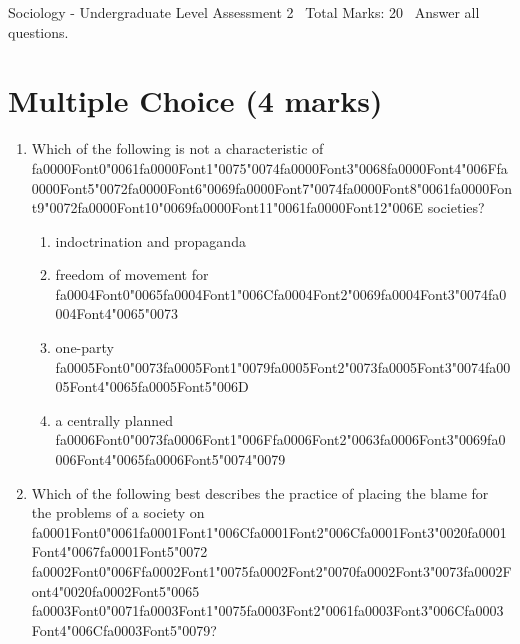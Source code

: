 \documentclass[12pt]{article}
\begin{document}
\begin{center}
Sociology - Undergraduate Level Assessment 2 \
Total Marks: 20 \
Answer all questions.
\end{center}

\section*{Multiple Choice (4 marks)}
\begin{enumerate}[label=\arabic*.]
\item Which of the following is not a characteristic of {\csname fa0000Font0\endcsname\char"0061}{\csname fa0000Font1\endcsname\char"0075}{\char"0074}{\csname fa0000Font3\endcsname\char"0068}{\csname fa0000Font4\endcsname\char"006F}{\csname fa0000Font5\endcsname\char"0072}{\csname fa0000Font6\endcsname\char"0069}{\csname fa0000Font7\endcsname\char"0074}{\csname fa0000Font8\endcsname\char"0061}{\csname fa0000Font9\endcsname\char"0072}{\csname fa0000Font10\endcsname\char"0069}{\csname fa0000Font11\endcsname\char"0061}{\csname fa0000Font12\endcsname\char"006E} societies?
\begin{enumerate}[label=(\alph*)]
    \item indoctrination and propaganda
    \item freedom of movement for {\csname fa0004Font0\endcsname\char"0065}{\csname fa0004Font1\endcsname\char"006C}{\csname fa0004Font2\endcsname\char"0069}{\csname fa0004Font3\endcsname\char"0074}{\csname fa0004Font4\endcsname\char"0065}{\char"0073}
    \item one-party {\csname fa0005Font0\endcsname\char"0073}{\csname fa0005Font1\endcsname\char"0079}{\csname fa0005Font2\endcsname\char"0073}{\csname fa0005Font3\endcsname\char"0074}{\csname fa0005Font4\endcsname\char"0065}{\csname fa0005Font5\endcsname\char"006D}
    \item a centrally planned {\csname fa0006Font0\endcsname\char"0073}{\csname fa0006Font1\endcsname\char"006F}{\csname fa0006Font2\endcsname\char"0063}{\csname fa0006Font3\endcsname\char"0069}{\csname fa0006Font4\endcsname\char"0065}{\csname fa0006Font5\endcsname\char"0074}{\char"0079}
\end{enumerate}
\item Which of the following best describes the practice of placing the blame for the problems of a society on {\csname fa0001Font0\endcsname\char"0061}{\csname fa0001Font1\endcsname\char"006C}{\csname fa0001Font2\endcsname\char"006C}{\csname fa0001Font3\endcsname\char"0020}{\csname fa0001Font4\endcsname\char"0067}{\csname fa0001Font5\endcsname\char"0072} {\csname fa0002Font0\endcsname\char"006F}{\csname fa0002Font1\endcsname\char"0075}{\csname fa0002Font2\endcsname\char"0070}{\csname fa0002Font3\endcsname\char"0073}{\csname fa0002Font4\endcsname\char"0020}{\csname fa0002Font5\endcsname\char"0065} {\csname fa0003Font0\endcsname\char"0071}{\csname fa0003Font1\endcsname\char"0075}{\csname fa0003Font2\endcsname\char"0061}{\csname fa0003Font3\endcsname\char"006C}{\csname fa0003Font4\endcsname\char"006C}{\csname fa0003Font5\endcsname\char"0079}?

\end{enumerate}
\end{document}
